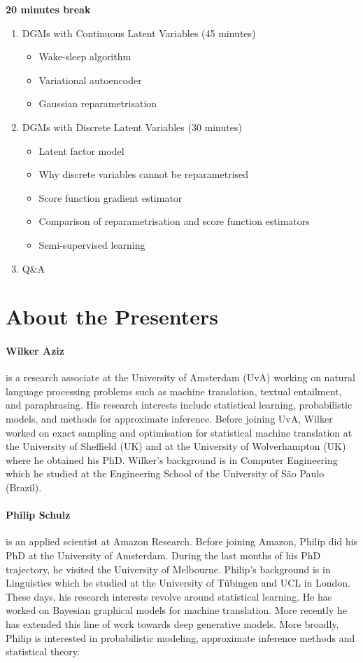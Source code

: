 \documentclass[11pt,a4paper]{article}
\begin{document}
\textbf{20 minutes break}

\begin{enumerate}[resume]
\item DGMs with Continuous Latent Variables (45 minutes)
\begin{itemize}
\item Wake-sleep algorithm
\item Variational autoencoder
\item Gaussian reparametrisation
\end{itemize}
\item DGMs with Discrete Latent Variables (30 minutes)
\begin{itemize}
\item Latent factor model
\item Why discrete variables cannot be reparametrised
\item Score function gradient estimator
\item Comparison of reparametrisation and score function estimators
\item Semi-supervised learning
\end{itemize}
\item Q\&A
\end{enumerate}

\section{About the Presenters}

\paragraph{Wilker Aziz} is a research associate at the University of Amsterdam (UvA) working on natural language processing problems such as machine translation, textual entailment, and paraphrasing. 
His research interests include statistical learning, probabilistic models, and methods for approximate inference.
Before joining UvA, Wilker worked on exact sampling and optimisation for statistical machine translation at the University of Sheffield (UK) and at the University of Wolverhampton (UK) where he obtained his PhD. 
Wilker's background is in Computer Engineering which he studied at the Engineering School of the University of S\~ao Paulo (Brazil). 
 

\paragraph{Philip Schulz} is an applied scientist at Amazon Research. Before joining Amazon, Philip did his PhD at the University of Amsterdam. During the last months of his PhD trajectory, he visited the University of Melbourne. Philip's background is in Linguistics which he studied at the University of T\"ubingen and UCL in London. These days, his research interests revolve around statistical learning. He has worked on Bayesian graphical models for machine translation. More recently he has extended this line of work towards deep generative models. More broadly, Philip is interested in probabilistic modeling, approximate inference methods and statistical theory.
\end{document}
